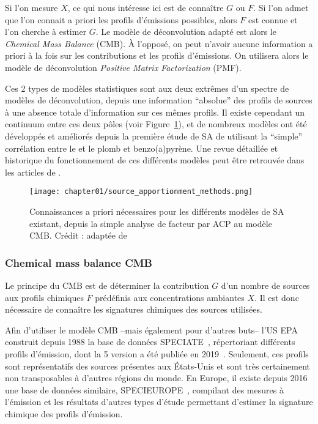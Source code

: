 Si l'on mesure $X$, ce qui nous intéresse ici est de connaître $G$ ou $F$.
Si l'on admet que l'on connait a priori les profils d'émissions possibles, alors $F$ est
connue et l'on cherche à estimer $G$. Le modèle de déconvolution adapté est alors le
\textit{Chemical Mass Balance} (CMB). À l'opposé, on peut n'avoir aucune information a
priori à la fois sur les contributions et les profils d'émissions. On utilisera alors le
modèle de déconvolution \textit{Positive Matrix Factorization} (PMF).

Ces 2 types de modèles statistiques sont aux deux extrêmes d'un spectre de modèles de
déconvolution, depuis une information ``absolue'' des profils de sources à une absence
totale d'information sur ces mêmes profils.  Il existe cependant un continuum entre ces
deux pôles (voir Figure~\ref{fig:chapter01/source_apportionment_methods}), et de nombreux
modèles ont été développés et améliorés depuis la première étude de SA de
\cite{colucciAutomotive1965} utilisant la ``simple'' corrélation entre le  et
le plomb et benzo(a)pyrène.  Une revue détaillée et historique du fonctionnement de ces
différents modèles peut être retrouvée dans les articles de
\cite{henryHistory1997,vianaSource2008,belisCritical2013,hopkeReview2016}.

\begin{figure}[ht]
    \centering
    \texttt{[image: chapter01/source\_apportionment\_methods.png]}
    \caption{
        Connaissances a priori nécessaires pour les différents modèles de SA existant,
        depuis la simple analyse de facteur par ACP au modèle CMB. Crédit :
        \cite{vianaSource2008} adaptée de \cite{schauerCharacterization2006}
    }%
    \label{fig:chapter01/source_apportionment_methods}
\end{figure}

\subsubsection{Chemical mass balance CMB}%
\label{ssub:chemical_mass_balance_cmb}

Le principe du CMB est de déterminer la contribution $G$ d'un nombre de sources
aux profils chimiques $F$ prédéfinis aux concentrations ambiantes $X$. Il est donc
nécessaire de connaître les signatures chimiques des sources utilisées.

Afin d'utiliser le modèle CMB --mais également pour d'autres buts-- l'US EPA construit
depuis 1988 la base de données SPECIATE~\autocite{simonDevelopment2010}, répertoriant
différents profils d'émission, dont la 5\ieme{}
version a été publiée en 2019~\autocite{u.s.environmentalprotectionagencySPECIATE2019}.
Seulement, ces profils sont représentatifs des sources présentes aux États-Unis et sont
très certainement non transposables à d'autres régions du monde.
En Europe, il existe depuis 2016 une base de données similaire,
SPECIEUROPE~\autocite{pernigottiSPECIEUROPE2016}, compilant des mesures à l'émission et
les résultats d'autres types d'étude permettant d'estimer la signature chimique des
profils d'émission.

